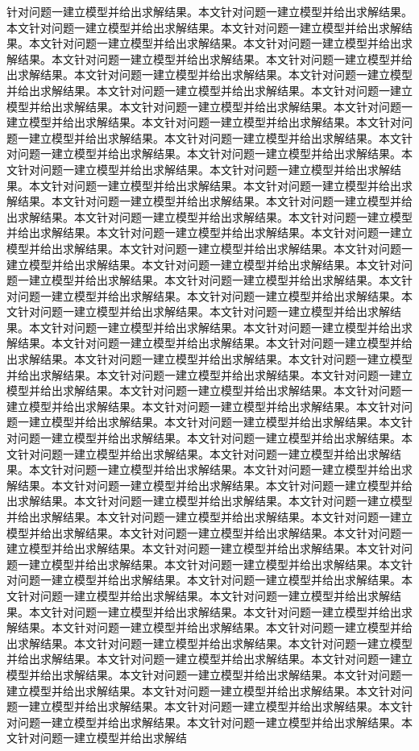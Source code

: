 针对问题一建立模型并给出求解结果。本文针对问题一建立模型并给出求解结果。本文针对问题一建立模型并给出求解结果。本文针对问题一建立模型并给出求解结果。本文针对问题一建立模型并给出求解结果。本文针对问题一建立模型并给出求解结果。本文针对问题一建立模型并给出求解结果。本文针对问题一建立模型并给出求解结果。本文针对问题一建立模型并给出求解结果。本文针对问题一建立模型并给出求解结果。本文针对问题一建立模型并给出求解结果。本文针对问题一建立模型并给出求解结果。本文针对问题一建立模型并给出求解结果。本文针对问题一建立模型并给出求解结果。本文针对问题一建立模型并给出求解结果。本文针对问题一建立模型并给出求解结果。本文针对问题一建立模型并给出求解结果。本文针对问题一建立模型并给出求解结果。本文针对问题一建立模型并给出求解结果。本文针对问题一建立模型并给出求解结果。本文针对问题一建立模型并给出求解结果。本文针对问题一建立模型并给出求解结果。本文针对问题一建立模型并给出求解结果。本文针对问题一建立模型并给出求解结果。本文针对问题一建立模型并给出求解结果。本文针对问题一建立模型并给出求解结果。本文针对问题一建立模型并给出求解结果。本文针对问题一建立模型并给出求解结果。本文针对问题一建立模型并给出求解结果。本文针对问题一建立模型并给出求解结果。本文针对问题一建立模型并给出求解结果。本文针对问题一建立模型并给出求解结果。本文针对问题一建立模型并给出求解结果。本文针对问题一建立模型并给出求解结果。本文针对问题一建立模型并给出求解结果。本文针对问题一建立模型并给出求解结果。本文针对问题一建立模型并给出求解结果。本文针对问题一建立模型并给出求解结果。本文针对问题一建立模型并给出求解结果。本文针对问题一建立模型并给出求解结果。本文针对问题一建立模型并给出求解结果。本文针对问题一建立模型并给出求解结果。本文针对问题一建立模型并给出求解结果。本文针对问题一建立模型并给出求解结果。本文针对问题一建立模型并给出求解结果。本文针对问题一建立模型并给出求解结果。本文针对问题一建立模型并给出求解结果。本文针对问题一建立模型并给出求解结果。本文针对问题一建立模型并给出求解结果。本文针对问题一建立模型并给出求解结果。本文针对问题一建立模型并给出求解结果。本文针对问题一建立模型并给出求解结果。本文针对问题一建立模型并给出求解结果。本文针对问题一建立模型并给出求解结果。本文针对问题一建立模型并给出求解结果。本文针对问题一建立模型并给出求解结果。本文针对问题一建立模型并给出求解结果。本文针对问题一建立模型并给出求解结果。本文针对问题一建立模型并给出求解结果。本文针对问题一建立模型并给出求解结果。本文针对问题一建立模型并给出求解结果。本文针对问题一建立模型并给出求解结果。本文针对问题一建立模型并给出求解结果。本文针对问题一建立模型并给出求解结果。本文针对问题一建立模型并给出求解结果。本文针对问题一建立模型并给出求解结果。本文针对问题一建立模型并给出求解结果。本文针对问题一建立模型并给出求解结果。本文针对问题一建立模型并给出求解结果。本文针对问题一建立模型并给出求解结果。本文针对问题一建立模型并给出求解结果。本文针对问题一建立模型并给出求解结果。本文针对问题一建立模型并给出求解结果。本文针对问题一建立模型并给出求解结果。本文针对问题一建立模型并给出求解结果。本文针对问题一建立模型并给出求解结果。本文针对问题一建立模型并给出求解结果。本文针对问题一建立模型并给出求解结果。本文针对问题一建立模型并给出求解结果。本文针对问题一建立模型并给出求解结果。本文针对问题一建立模型并给出求解结果。本文针对问题一建立模型并给出求解结果。本文针对问题一建立模型并给出求解结果。本文针对问题一建立模型并给出求解结果。本文针对问题一建立模型并给出求解结果。本文针对问题一建立模型并给出求解结果。本文针对问题一建立模型并给出求解结果。本文针对问题一建立模型并给出求解结